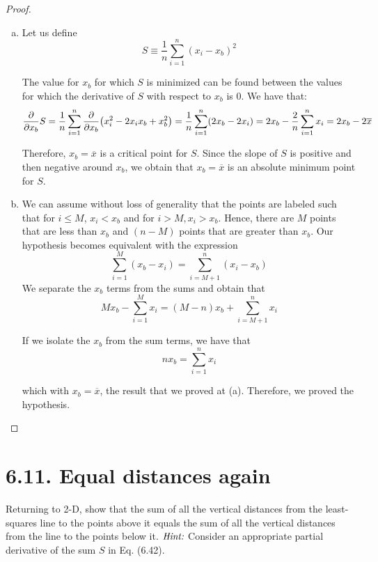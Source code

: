 \begin{proof}
    \hfill
    \begin{enumerate}[(a)]
        \item Let us define
            \[
                S \equiv \frac{1}{n} \sum_{i = 1}^n (x_i - x_b)^2
            \] 
            
        The value for $x_b$ for which $S$ is minimized can be found between the values
        for which the derivative of $S$ with respect to $x_b$ is 0. We have that:
        \[
            \pdv{x_b}S = \frac{1}{n} \sum_{i = 1}^n \pdv{x_b}(x_i^2 - 2x_i x_b + x_b^2) 
            = \frac{1}{n} \sum_{i = 1}^n (2x_b - 2x_i) = 2x_b - \frac{2}{n} \sum_{i = 1}^n x_i
            = 2x_b - 2\overline{x}
        \] 

        Therefore, $x_b = \overline{x}$ is a critical point for $S$. Since the slope
        of $S$ is positive and then negative around $x_b$, we obtain that $x_b = \overline{x}$
        is an absolute minimum point for $S$. 

    \item We can assume without loss of generality that the points are labeled such that
        for $i \leq M$, $x_i < x_b$ and for $i > M, x_i > x_b$. Hence, there are $M$ points
        that are less than $x_b$ and $(n - M)$ points that are greater than $x_b$. Our
        hypothesis becomes equivalent with the expression 
        \[
            \sum_{i = 1}^M (x_b - x_i) = \sum_{i = M + 1}^n (x_i - x_b)
        \] 
        We separate the $x_b$ terms from the sums and obtain that
        \[
            Mx_b - \sum_{i = 1}^M x_i = (M - n) x_b + \sum_{i = M + 1}^n x_i
        \] 

        If we isolate the $x_b$ from the sum terms, we have that
        \[
            nx_b = \sum_{i = 1}^{n} x_i
        \] 

        which with $x_b = \overline{x}$, the result that we proved at (a). Therefore,
        we proved the hypothesis.
    \end{enumerate}
\end{proof}

\section*{6.11. Equal distances again}
Returning to 2-D, show that the sum of all the vertical distances from 
the least-squares line to the points above it equals the sum of all the vertical
distances from the line to the points below it. $\emph{Hint:}$ Consider an appropriate
partial derivative of the sum $S$ in Eq. (6.42).

